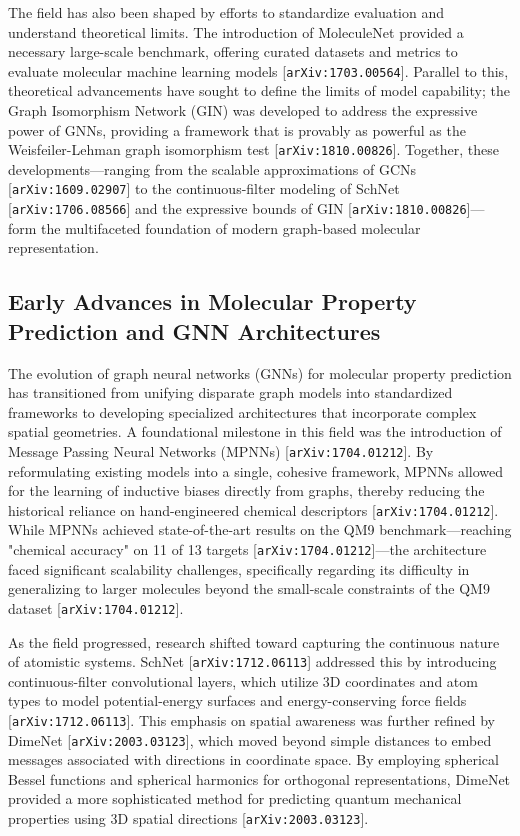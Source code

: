 \documentclass[11pt]{article}
\begin{document}
The field has also been shaped by efforts to standardize evaluation and understand theoretical limits. The introduction of MoleculeNet provided a necessary large-scale benchmark, offering curated datasets and metrics to evaluate molecular machine learning models [\texttt{arXiv:1703.00564}]. Parallel to this, theoretical advancements have sought to define the limits of model capability; the Graph Isomorphism Network (GIN) was developed to address the expressive power of GNNs, providing a framework that is provably as powerful as the Weisfeiler-Lehman graph isomorphism test [\texttt{arXiv:1810.00826}]. Together, these developments—ranging from the scalable approximations of GCNs [\texttt{arXiv:1609.02907}] to the continuous-filter modeling of SchNet [\texttt{arXiv:1706.08566}] and the expressive bounds of GIN [\texttt{arXiv:1810.00826}]—form the multifaceted foundation of modern graph-based molecular representation.

\subsection{Early Advances in Molecular Property Prediction and GNN Architectures}

The evolution of graph neural networks (GNNs) for molecular property prediction has transitioned from unifying disparate graph models into standardized frameworks to developing specialized architectures that incorporate complex spatial geometries. A foundational milestone in this field was the introduction of Message Passing Neural Networks (MPNNs) [\texttt{arXiv:1704.01212}]. By reformulating existing models into a single, cohesive framework, MPNNs allowed for the learning of inductive biases directly from graphs, thereby reducing the historical reliance on hand-engineered chemical descriptors [\texttt{arXiv:1704.01212}]. While MPNNs achieved state-of-the-art results on the QM9 benchmark—reaching "chemical accuracy" on 11 of 13 targets [\texttt{arXiv:1704.01212}]—the architecture faced significant scalability challenges, specifically regarding its difficulty in generalizing to larger molecules beyond the small-scale constraints of the QM9 dataset [\texttt{arXiv:1704.01212}].

As the field progressed, research shifted toward capturing the continuous nature of atomistic systems. SchNet [\texttt{arXiv:1712.06113}] addressed this by introducing continuous-filter convolutional layers, which utilize 3D coordinates and atom types to model potential-energy surfaces and energy-conserving force fields [\texttt{arXiv:1712.06113}]. This emphasis on spatial awareness was further refined by DimeNet [\texttt{arXiv:2003.03123}], which moved beyond simple distances to embed messages associated with directions in coordinate space. By employing spherical Bessel functions and spherical harmonics for orthogonal representations, DimeNet provided a more sophisticated method for predicting quantum mechanical properties using 3D spatial directions [\texttt{arXiv:2003.03123}].
\end{document}
